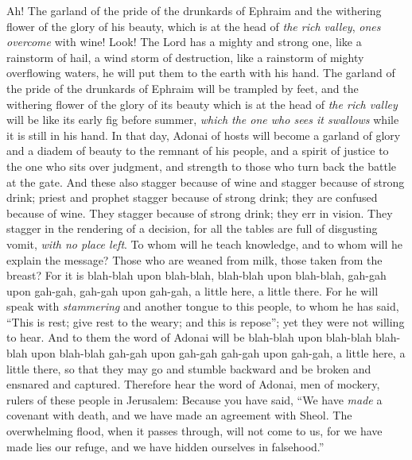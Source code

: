 \begin{biblechapter} %
 Ah! The garland of the pride of the drunkards of Ephraim 
and the withering flower of the glory of his beauty, 
which is at the head of \textit{the rich valley}, 
\textit{ones overcome} with wine!
\verse Look! The Lord has a mighty and strong one, 
like a rainstorm of hail, a wind storm of destruction, 
like a rainstorm of mighty overflowing waters, 
he will put them to the earth with his hand.
\verse The garland of the pride of the drunkards of Ephraim 
will be trampled by feet,
\verse and the withering flower of the glory of its beauty 
which is at the head of \textit{the rich valley} 
will be like its early fig before summer, 
\textit{which the one who sees it swallows} while it is still in his hand.
\verse In that day, Adonai of hosts will become a garland of glory 
and a diadem of beauty to the remnant of his people,
\verse and a spirit of justice to the one who sits over judgment, 
and strength to those who turn back the battle at the gate.
\verse And these also stagger because of wine 
and stagger because of strong drink; 
priest and prophet stagger because of strong drink; 
they are confused because of wine. 
They stagger because of strong drink; 
they err in vision. 
They stagger in the rendering of a decision,
\verse for all the tables are full of disgusting vomit, \textit{with no place left}.
\verse To whom will he teach knowledge, 
and to whom will he explain the message? 
Those who are weaned from milk, 
those taken from the breast?
\verse For it is blah-blah upon blah-blah, 
blah-blah upon blah-blah, 
gah-gah upon gah-gah, 
gah-gah upon gah-gah, 
a little here, a little there.
\verse For he will speak with \textit{stammering} and another tongue to this people,
\verse to whom he has said, “This is rest; give rest to the weary; 
and this is repose”; yet they were not willing to hear.
\verse And to them the word of Adonai will be blah-blah upon blah-blah 
blah-blah upon blah-blah 
gah-gah upon gah-gah 
gah-gah upon gah-gah, 
a little here, a little there, 
so that they may go and stumble backward 
and be broken and ensnared and captured.
 Therefore hear the word of Adonai, men of mockery, 
rulers of these people in Jerusalem:
\verse Because you have said, “We have \textit{made} a covenant with death, 
and we have made an agreement with Sheol. The overwhelming flood, when it passes through, will not come to us, for we have made lies our refuge, 
and we have hidden ourselves in falsehood.”

\end{biblechapter}
